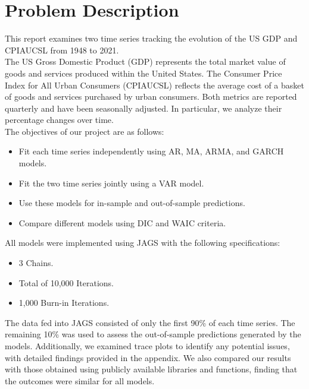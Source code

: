 \section{Problem Description}
This report examines two time series tracking the evolution of the US GDP and CPIAUCSL from 1948 to 2021. \\
The US Gross Domestic Product (GDP) represents the total market value of goods and services produced within the United States. The Consumer Price Index for All Urban Consumers (CPIAUCSL) reflects the average cost of a basket of goods and services purchased by urban consumers. Both metrics are reported quarterly and have been seasonally adjusted. In particular, we analyze their percentage changes over time. \\
The objectives of our project are as follows:
\begin{itemize}
    \item Fit each time series independently using AR, MA, ARMA, and GARCH models.
    \item Fit the two time series jointly using a VAR model.
    \item Use these models for in-sample and out-of-sample predictions.
    \item Compare different models using DIC and WAIC criteria.
\end{itemize}
All models were implemented using JAGS with the following specifications:
\begin{itemize}
    \item 3 Chains.
    \item Total of 10,000 Iterations.
    \item 1,000 Burn-in Iterations.
\end{itemize}
The data fed into JAGS consisted of only the first 90\% of each time series. The remaining 10\% was used to assess the out-of-sample predictions generated by the models.
Additionally, we examined trace plots to identify any potential issues, with detailed findings provided in the appendix. We also compared our results with those obtained using publicly available libraries and functions, finding that the outcomes were similar for all models. \\